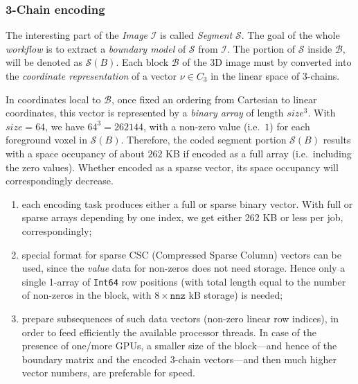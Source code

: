 \subsubsection*{3-Chain encoding}
\label{chain-coding}
The interesting part of the \emph{Image} $\mathcal{I}$ is called \emph{Segment} $\mathcal{S}$. The goal of the whole \emph{workflow} is to extract a \emph{boundary model} of $\mathcal{S}$ from $\mathcal{I}$. The portion of $\mathcal{S}$ inside $\mathcal{B}$, will be denoted as $\mathcal{S}(B)$.
Each block $\mathcal{B}$ of the 3D image must by converted into the \emph{coordinate representation} of a vector $\nu\in C_3$ in the linear space  of 3-chains. 

In coordinates local to $\mathcal{B}$, once fixed an ordering from Cartesian to linear coordinates, this vector is represented by a \emph{binary array} of length $size^3$. With $size=64$, we have $64^3=262144$,  with a non-zero value (i.e.~$1$) for each foreground voxel in $\mathcal{S}(B)$. Therefore, the coded segment portion $\mathcal{S}(B)$ results with a space occupancy of about $262$ KB if encoded as a full array (i.e.~including the zero values). Whether encoded as a sparse vector, its space occupancy will correspondingly decrease.

\begin{enumerate}

\item each encoding task produces either a full or sparse binary vector. With full or sparse arrays depending by one index, we get either 262 KB or less per job, correspondingly;

\item special format for sparse CSC (Compressed Sparse Column) vectors can be used, since the \emph{value} data for non-zeros does not need storage. Hence only a single 1-array of \texttt{Int64} row positions (with total length equal to the number of non-zeros in the block, with $8\times\mathtt{nnz}$ kB storage) is needed;

\item prepare subsequences of such data vectors (non-zero linear row indices), in order to feed efficiently the available processor threads.
In case of the presence of one/more GPUs, a smaller size of the block---and hence of the boundary matrix and the encoded 3-chain vectors---and then much higher vector numbers, are preferable for speed.

\end{enumerate}

